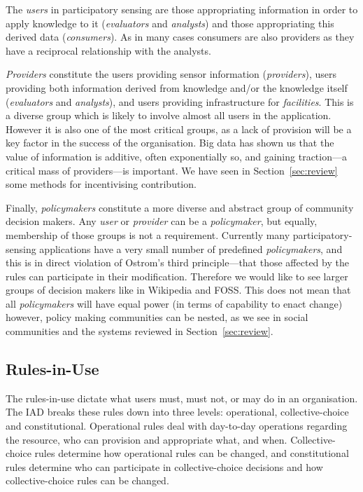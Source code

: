 The \emph{users} in participatory sensing are those appropriating information in order to apply knowledge to it (\emph{evaluators} and \emph{analysts}) and those appropriating this derived data (\emph{consumers}). As in many cases consumers are also providers as they have a reciprocal relationship with the analysts.

\emph{Providers} constitute the users providing sensor information (\emph{providers}), users providing both information derived from knowledge and/or the knowledge itself (\emph{evaluators} and \emph{analysts}), and users providing infrastructure for \emph{facilities}. This is a diverse group which is likely to involve almost all users in the application. However it is also one of the most critical groups, as a lack of provision will be a key factor in the success of the organisation. Big data has shown us that the value of information is additive, often exponentially so, and gaining traction---a critical mass of providers---is important. 
We have seen in Section~\ref{sec:review} some methods for incentivising contribution.

Finally, \emph{policymakers} constitute a more diverse and abstract group of community decision makers. Any \emph{user} or \emph{provider} can be a \emph{policymaker}, but equally, membership of those groups is not a requirement. 
Currently many participatory-sensing applications have a very small number of predefined \emph{policymakers}, and this is in direct violation of Ostrom's third principle---that those affected by the rules can participate in their modification. 
Therefore we would like to see larger groups of decision makers like in Wikipedia and \ac{FOSS}. This does not mean that all \emph{policymakers} will have equal power (in terms of capability to enact change) however, policy making communities can be nested, as we see in social communities and the systems reviewed in Section~\ref{sec:review}.


\subsection{Rules-in-Use}

The rules-in-use dictate what users must, must not, or may do in an organisation. The \ac{IAD} breaks these rules down into three levels: operational, collective-choice and constitutional. Operational rules deal with day-to-day operations regarding the resource, who can provision and appropriate what, and when. 
Collective-choice rules determine how operational rules can be changed, and constitutional rules determine who can participate in collective-choice decisions and how collective-choice rules can be changed.

